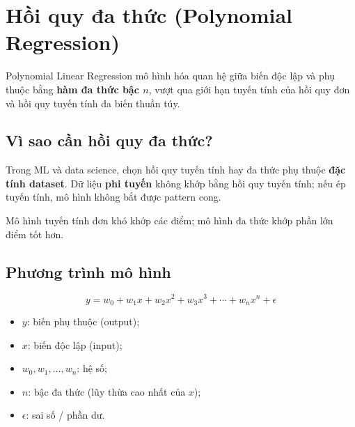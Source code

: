 \section{Hồi quy đa thức (Polynomial Regression)}
\label{sec:polynomial-regression}

\begin{dinhnghia}[title={Hồi quy đa thức}]
Polynomial Linear Regression mô hình hóa quan hệ giữa biến độc lập và phụ thuộc bằng \textbf{hàm đa thức bậc $n$}, vượt qua giới hạn tuyến tính của hồi quy đơn và hồi quy tuyến tính đa biến thuần túy.
\end{dinhnghia}

\subsection{Vì sao cần hồi quy đa thức?}

\begin{dongco}[title={Chọn linear hay polynomial}]
Trong ML và data science, chọn hồi quy tuyến tính hay đa thức phụ thuộc \textbf{đặc tính dataset}.
Dữ liệu \textbf{phi tuyến} không khớp bằng hồi quy tuyến tính; nếu ép tuyến tính, mô hình không bắt được pattern cong.
\end{dongco}


\begin{ynghia}[title={Đọc hình so sánh}]
Mô hình tuyến tính đơn khó khớp các điểm; mô hình đa thức khớp phần lớn điểm tốt hơn.
\end{ynghia}

\subsection{Phương trình mô hình}

\begin{dinhnghia}[title={Đa thức bậc $n$}]
\[
y = w_0 + w_1 x + w_2 x^2 + w_3 x^3 + \cdots + w_n x^n + \epsilon
\]
\begin{itemize}
  \item $y$: biến phụ thuộc (output);
  \item $x$: biến độc lập (input);
  \item $w_0, w_1, \ldots, w_n$: hệ số;
  \item $n$: bậc đa thức (lũy thừa cao nhất của $x$);
  \item $\epsilon$: sai số / phần dư.
\end{itemize}
\end{dinhnghia}

